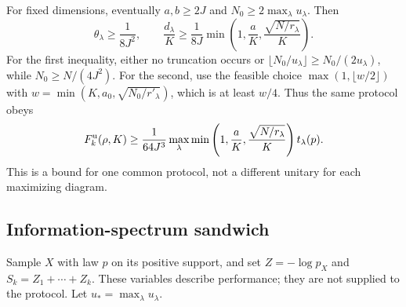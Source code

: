 For fixed dimensions, eventually $a,b\ge2J$ and $N_0\ge2\max_\lambda u_\lambda$. Then
\[
 \theta_\lambda\ge\frac1{8J^2},\qquad
 \frac{d_\lambda}K\ge\frac1{8J}
 \min\left(1,\frac aK,\frac{\sqrt{N/r_\lambda}}K\right).
\]
For the first inequality, either no truncation occurs or
$\lfloor N_0/u_\lambda\rfloor\ge N_0/(2u_\lambda)$, while $N_0\ge N/(4J^2)$. For the second, use the feasible choice $\max(1,\lfloor w/2\rfloor)$ with $w=\min(K,a_0,\sqrt{N_0/r'_\lambda})$, which is at least $w/4$. Thus the same protocol obeys
\begin{equation}\label{eq:univ-exponent-bound}
 F_k^{\rm u}(\rho,K)\ge\frac1{64J^3}\max_\lambda
 \min\left(1,\frac aK,\frac{\sqrt{N/r_\lambda}}K\right)t_\lambda(p).
\end{equation}
This is a bound for one common protocol, not a different unitary for each maximizing diagram.

\subsection{Information-spectrum sandwich}
Sample $X$ with law $p$ on its positive support, and set $Z=-\log p_X$ and $S_k=Z_1+\cdots+Z_k$. These variables describe performance; they are not supplied to the protocol. Let $u_*=\max_\lambda u_\lambda$.

